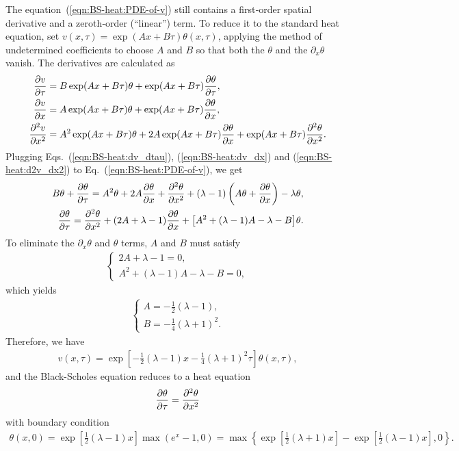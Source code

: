 \documentclass{book}
\begin{document}
The equation~(\ref{eqn:BS-heat:PDE-of-v}) still contains a first‐order spatial derivative and a zeroth‐order (“linear”) term. To reduce it to the standard heat equation, set $v(x,\tau) = \exp(Ax + B\tau)\theta(x,\tau)$, applying the method of undetermined coefficients to choose $A$ and $B$ so that both the $\theta$ and the $\partial_x\theta$ vanish. The derivatives are calculated as
\begin{align}
    \label{eqn:BS-heat:dv_dtau}
    \pdv{v}{\tau} &= B \exp(Ax + B\tau)\theta + \exp(Ax + B\tau)\pdv{\theta}{\tau},\\
    \label{eqn:BS-heat:dv_dx}
    \pdv{v}{x} &= A \exp(Ax + B\tau)\theta + \exp(Ax + B\tau)\pdv{\theta}{x},\\
    \label{eqn:BS-heat:d2v_dx2}
    \pdv[2]{v}{x} &= A^2 \exp(Ax + B\tau)\theta + 2 A \exp(Ax + B\tau)\pdv{\theta}{x} + \exp(Ax + B\tau)\pdv[2]{\theta}{x}.
\end{align}
Plugging Eqs.~(\ref{eqn:BS-heat:dv_dtau}), (\ref{eqn:BS-heat:dv_dx}) and (\ref{eqn:BS-heat:d2v_dx2}) to Eq.~(\ref{eqn:BS-heat:PDE-of-v}), we get 
\begin{align}
    B\theta + \pdv{\theta}{\tau}  =  A^2\theta + 2A\pdv{\theta}{x} + \pdv[2]{\theta}{x} + (\lambda - 1) \left(A\theta + \pdv{\theta}{x}\right) - \lambda \theta, \notag\\
    \pdv{\theta}{\tau} = \pdv[2]{\theta}{x} + (2A + \lambda - 1) \pdv{\theta}{x} + \big[A^2 + (\lambda - 1) A - \lambda - B\big] \theta .\notag
\end{align}
To eliminate the $\partial_x\theta$ and $\theta$ terms, $A$ and $B$ must satisfy
\begin{align*}
    \begin{cases}
        2A + \lambda - 1 = 0,\\
        A^2 + (\lambda - 1) A - \lambda - B = 0,
    \end{cases}
\end{align*}
which yields
\begin{align}
    \begin{cases}
        A = -\frac{1}{2} (\lambda - 1),\\
        B = -\frac{1}{4} (\lambda + 1)^2 .
    \end{cases}
\end{align}
Therefore, we have 
\begin{align}
    \label{eqn:BS-heat:var-tf-v-theta}
    v(x, \tau) = \exp[-\frac{1}{2} (\lambda - 1) x -\frac{1}{4} (\lambda + 1)^2 \tau] \theta(x, \tau),
\end{align}
and the Black-Scholes equation reduces to a heat equation
\begin{align}
    \label{eqn:BS-heat:heat-eq-of-theta}
    \pdv{\theta}{\tau} = \pdv[2]{\theta}{x}
\end{align}
with boundary condition
\begin{align}
    \label{eqn:BS-heat:heat-eq-of-theta-bound-cond}
    \theta(x,0) = \exp[\frac{1}{2}(\lambda - 1)x] \max(e^{x} - 1, 0) =  \max\left\{\exp[\frac{1}{2}(\lambda + 1)x] - \exp[\frac{1}{2}(\lambda - 1)x], 0\right\}.
\end{align}
\end{document}
